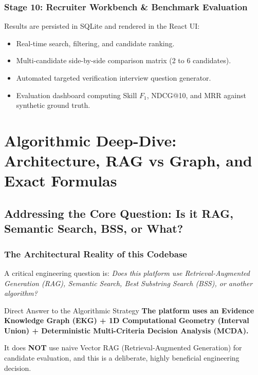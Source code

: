 \documentclass[11pt,a4paper]{report}
\begin{document}
\subsection{Stage 10: Recruiter Workbench \& Benchmark Evaluation}
Results are persisted in SQLite and rendered in the React UI:
\begin{itemize}[leftmargin=1.5em]
    \item Real-time search, filtering, and candidate ranking.
    \item Multi-candidate side-by-side comparison matrix (2 to 6 candidates).
    \item Automated targeted verification interview question generator.
    \item Evaluation dashboard computing Skill $F_1$, NDCG@10, and MRR against synthetic ground truth.
\end{itemize}

\chapter{Algorithmic Deep-Dive: Architecture, RAG vs Graph, and Exact Formulas}

\section{Addressing the Core Question: Is it RAG, Semantic Search, BSS, or What?}

\subsection{The Architectural Reality of this Codebase}
A critical engineering question is: \emph{Does this platform use Retrieval-Augmented Generation (RAG), Semantic Search, Best Substring Search (BSS), or another algorithm?}

\begin{techbox}{Direct Answer to the Algorithmic Strategy}
\textbf{The platform uses an Evidence Knowledge Graph (EKG) + 1D Computational Geometry (Interval Union) + Deterministic Multi-Criteria Decision Analysis (MCDA).}

It does \textbf{NOT} use naive Vector RAG (Retrieval-Augmented Generation) for candidate evaluation, and this is a deliberate, highly beneficial engineering decision.
\end{techbox}
\end{document}
